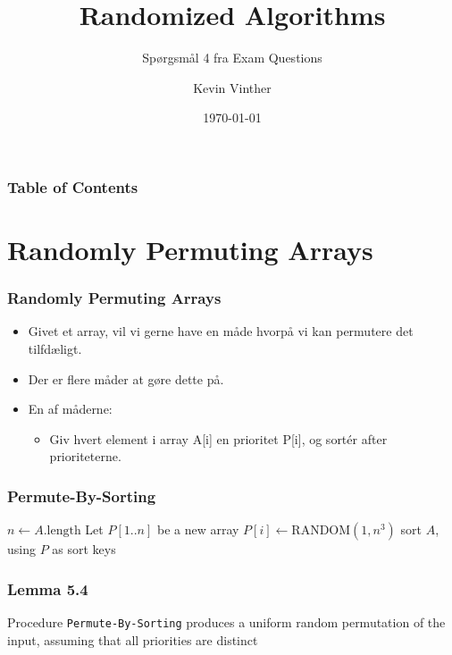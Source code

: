\documentclass{beamer}
\title{Randomized Algorithms}
\subtitle{Spørgsmål 4 fra Exam Questions}
\author{Kevin Vinther}
\date{\today}
\begin{document}
\begin{frame}
  \titlepage
\end{frame}

\begin{frame}[allowframebreaks]
  \frametitle{Table of Contents}
  \tableofcontents
\end{frame}

\section{Randomly Permuting Arrays}
\label{sec:cormen5}


\begin{frame}
  \frametitle{Randomly Permuting Arrays}
  \begin{itemize}
  \item Givet et array, vil vi gerne have en måde hvorpå vi kan permutere det tilfdæligt. 
  \item Der er flere måder at gøre dette på.
  \item En af måderne:
    \begin{itemize}
    \item Giv hvert element i array A[i] en prioritet P[i], og sortér after prioriteterne.
    \end{itemize}
  \end{itemize}
\end{frame}

\begin{frame}
  \frametitle{Permute-By-Sorting}
  
  \begin{algorithmic}[1]
      \State $n \gets A.\text{length}$
      \State Let $P[1..n]$ be a new array
      \State $P[i] \gets \text{RANDOM}(1, n^3)$
      \EndFor
      \State sort $A$, using $P$ as sort keys
    \end{algorithmic}
\end{frame}

\begin{frame}
  \frametitle{Lemma 5.4}
  \begin{lemma}[Lemma 5.4]
  Procedure \texttt{Permute-By-Sorting} produces a uniform random permutation of the input, assuming that all priorities are distinct
  \end{lemma}
\end{frame}
\end{document}
